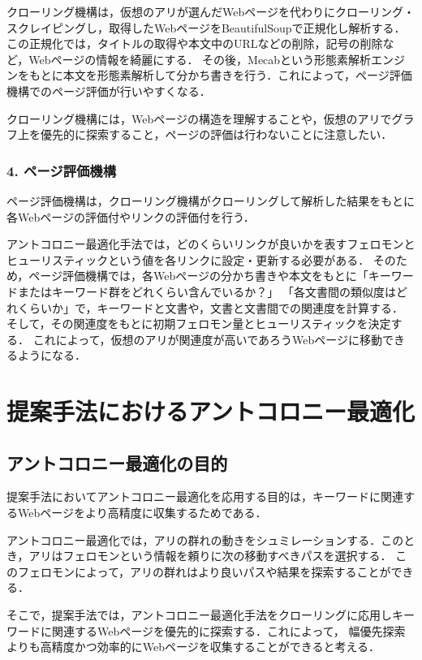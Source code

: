クローリング機構は，仮想のアリが選んだWebページを代わりにクローリング・スクレイピングし，取得したWebページをBeautifulSoupで正規化し解析する．
この正規化では，タイトルの取得や本文中のURLなどの削除，記号の削除など，Webページの情報を綺麗にする．
その後，Mecabという形態素解析エンジンをもとに本文を形態素解析して分かち書きを行う．これによって，ページ評価機構でのページ評価が行いやすくなる．

クローリング機構には，Webページの構造を理解することや，仮想のアリでグラフ上を優先的に探索すること，ページの評価は行わないことに注意したい．


\subsubsection{4. ページ評価機構}
ページ評価機構は，クローリング機構がクローリングして解析した結果をもとに各Webページの評価付やリンクの評価付を行う．

アントコロニー最適化手法では，どのくらいリンクが良いかを表すフェロモンとヒューリスティックという値を各リンクに設定・更新する必要がある．
そのため，ページ評価機構では，各Webページの分かち書きや本文をもとに「キーワードまたはキーワード群をどれくらい含んでいるか？」
「各文書間の類似度はどれくらいか」で，キーワードと文書や，文書と文書間での関連度を計算する．
そして，その関連度をもとに初期フェロモン量とヒューリスティックを決定する．
これによって，仮想のアリが関連度が高いであろうWebページに移動できるようになる．

\section{提案手法におけるアントコロニー最適化}

\subsection{アントコロニー最適化の目的}
提案手法においてアントコロニー最適化を応用する目的は，キーワードに関連するWebページをより高精度に収集するためである．

アントコロニー最適化では，アリの群れの動きをシュミレーションする．このとき，アリはフェロモンという情報を頼りに次の移動すべきパスを選択する．
このフェロモンによって，アリの群れはより良いパスや結果を探索することができる．

そこで，提案手法では，アントコロニー最適化手法をクローリングに応用しキーワードに関連するWebページを優先的に探索する．これによって，
幅優先探索よりも高精度かつ効率的にWebページを収集することができると考える．

